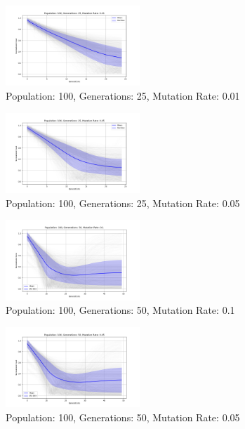 \documentclass[
]{article}
\begin{document}
    \begin{figure}[H]
        \centering
        \includegraphics[width=0.45\textwidth]{genetic_algorithm/appendix/Population_100_Generations_25_MutationRate_0.01}
        \caption{Population: 100, Generations: 25, Mutation Rate: 0.01}
        \label{fig:app_ga_100_25_01}
    \end{figure}

    \begin{figure}[H]
        \centering
        \includegraphics[width=0.45\textwidth]{genetic_algorithm/appendix/Population_100_Generations_25_MutationRate_0.05}
        \caption{Population: 100, Generations: 25, Mutation Rate: 0.05}
        \label{fig:app_ga_100_25_05}
    \end{figure}

    \begin{figure}[H]
        \centering
        \includegraphics[width=0.45\textwidth]{genetic_algorithm/appendix/Population_100_Generations_50_MutationRate_0.1}
        \caption{Population: 100, Generations: 50, Mutation Rate: 0.1}
        \label{fig:app_ga_100_50_1}
    \end{figure}

    \begin{figure}[H]
        \centering
        \includegraphics[width=0.45\textwidth]{genetic_algorithm/appendix/Population_100_Generations_50_MutationRate_0.05}
        \caption{Population: 100, Generations: 50, Mutation Rate: 0.05}
        \label{fig:app_ga_100_50_05}
    \end{figure}
\end{document}
